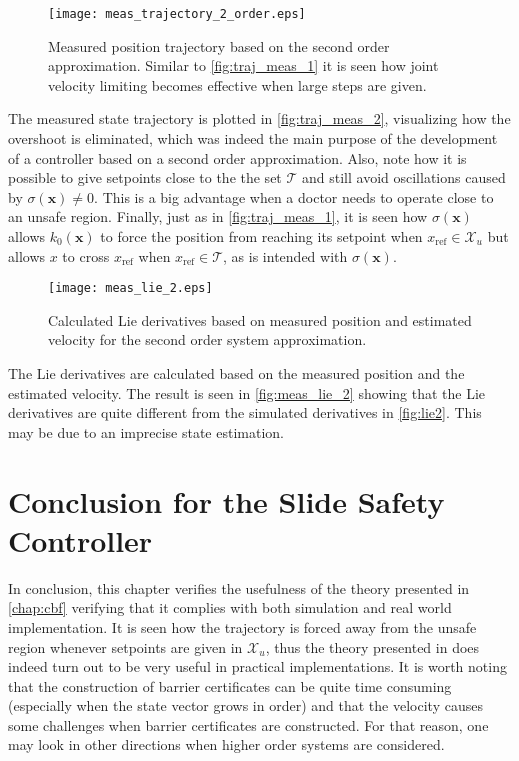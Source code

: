 \vspace{-3mm}
\begin{figure}[H]
	\center
		\texttt{[image: meas\_trajectory\_2\_order.eps]}
	\caption{Measured position trajectory based on the second order approximation. Similar to \autoref{fig:traj_meas_1} it is seen how joint velocity limiting becomes effective when large steps are given.}
    \label{fig:traj_meas_2}
\end{figure}
The measured state trajectory is plotted in \autoref{fig:traj_meas_2}, visualizing how the overshoot is eliminated, which was indeed the main purpose of the development of a controller based on a second order approximation. Also, note how it is possible to give setpoints close to the the set $\mathcal{T}$ and still avoid oscillations caused by $\sigma(\mathbf{x})\neq 0$. This is a big advantage when a doctor needs to operate close to an unsafe region. Finally, just as in \autoref{fig:traj_meas_1}, it is seen how $\sigma(\mathbf{x})$ allows $k_0(\mathbf{x})$ to force the position from reaching its setpoint when $x_\text{ref} \in \mathcal{X}_u$ but allows $x$ to cross $x_\text{ref}$ when $x_\text{ref} \in \mathcal{T}$, as is intended with $\sigma(\mathbf{x})$.

\begin{figure}[H]
	\center
		\texttt{[image: meas\_lie\_2.eps]}
	\caption{Calculated Lie derivatives based on measured position and estimated velocity for the second order system approximation. }
    \label{fig:meas_lie_2}
\end{figure}
The Lie derivatives are calculated based on the measured position and the estimated velocity. The result is seen in \autoref{fig:meas_lie_2} showing that the Lie derivatives  are quite different from the simulated derivatives in \autoref{fig:lie2}. This may be due to an imprecise state estimation.

\section{Conclusion for the Slide Safety Controller}\label{subsec:conclusion-slide-safety}
In conclusion, this chapter verifies the usefulness of the theory presented in \autoref{chap:cbf} verifying that it complies with both simulation and real world implementation. It is seen how the trajectory is forced away from the unsafe region whenever setpoints are given in $\mathcal{X}_u$, thus the theory presented in \citep{bib:org_control} does indeed turn out to be very useful in practical implementations. It is worth noting that the construction of barrier certificates can be quite time consuming (especially when the state vector grows in order) and that the velocity causes some challenges when barrier certificates are constructed. For that reason, one may look in other directions when higher order systems are considered.

